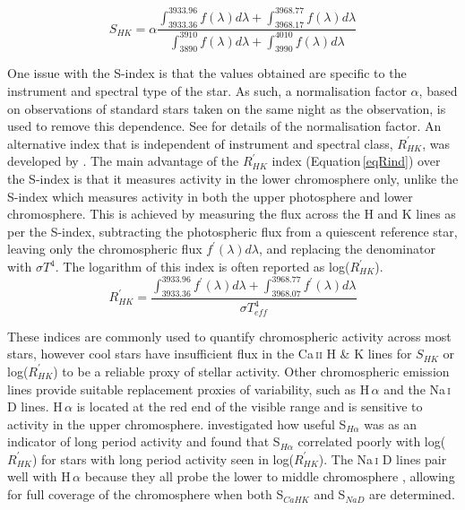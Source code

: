 \begin{equation}
	S_{HK} = \alpha\frac{\int_{3933.36}^{3933.96}f(\lambda)d\lambda+\int_{3968.17}^{3968.77}f(\lambda)d\lambda}{\int_{3890}^{3910}f(\lambda)d\lambda+\int_{3990}^{4010}f(\lambda)d\lambda}
	\label{eqSind}
\end{equation}

One issue with the S-index is that the values obtained are specific to the instrument and spectral type of the star. As such, a normalisation factor $\alpha$, based on observations of standard stars taken on the same night as the observation, is used to remove this dependence. See \citet{1982Middelkoop} for details of the normalisation factor. An alternative index that is independent of instrument and spectral class, $R^{\prime}_{HK}$, was developed by \citet{1984Noyes}. The main advantage of the $R^{\prime}_{HK}$ index (Equation\,\ref{eqRind}) over the S-index is that it measures activity in the lower chromosphere only, unlike the S-index which measures activity in both the upper photosphere and lower chromosphere. This is achieved by measuring the flux across the H and K lines as per the S-index, subtracting the photospheric flux from a quiescent reference star, leaving only the chromospheric flux $f^{\prime}(\lambda)d\lambda$, and replacing the denominator with $\sigma T^{4}$. The logarithm of this index is often reported as log($R^{\prime}_{HK}$).\\

\begin{equation}
	R^{\prime}_{HK} = \frac{\int_{3933.36}^{3933.96}f^{\prime}(\lambda)d\lambda+\int_{3968.07}^{3968.77}f^{\prime}(\lambda)d\lambda}{\sigma T^4_{eff}}
	\label{eqRind}
\end{equation}

These indices are commonly used to quantify chromospheric activity across most stars, however cool stars have insufficient flux in the Ca\,\textsc{ii} H \& K lines for $S_{HK}$ or log($R^{\prime}_{HK}$) to be a reliable proxy of stellar activity. Other chromospheric emission lines provide suitable replacement proxies of variability, such as H\,\textsc{$\alpha$} and the Na\,\textsc{i} D lines. H\,\textsc{$\alpha$} is located at the red end of the visible range and is sensitive to activity in the upper chromosphere. \citet{2014Gomes} investigated how useful S$_{H\alpha}$ was as an indicator of long period activity and found that S$_{H\alpha}$ correlated poorly with log($R^{\prime}_{HK}$) for stars with long period activity seen in log($R^{\prime}_{HK}$). The Na\,\textsc{i} D lines pair well with H\,\textsc{$\alpha$} because they all probe the lower to middle chromosphere \citep{2000Mauas}, allowing for full coverage of the chromosphere when both S$_{CaHK}$ and S$_{NaD}$ are determined.\\

